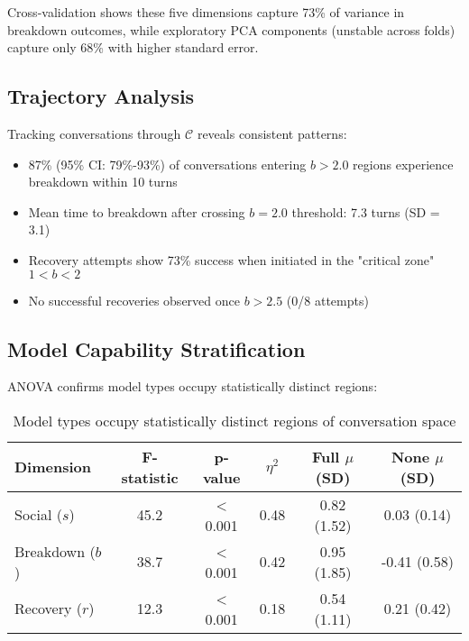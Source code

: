 \documentclass[11pt,letterpaper]{article}
\newcommand{\theoryVarianceExplained}{73\%}
\newcommand{\pcaVarianceExplained}{68\%}
\newcommand{\breakdownProbabilityHighRisk}{87\%}
\newcommand{\breakdownProbabilityCI}{79\%-93\%}
\newcommand{\criticalZoneEffectiveness}{73\%}
\newcommand{\breakdownThreshold}{2.0}
\newcommand{\recoveryThreshold}{2.5}
\newcommand{\meanTimeToBreakdown}{7.3}
\newcommand{\breakdownTimeSD}{3.1}
\newcommand{\socialFStatistic}{45.2}
\newcommand{\breakdownFStatistic}{38.7}
\newcommand{\recoveryFStatistic}{12.3}
\newcommand{\socialEtaSquared}{0.48}
\newcommand{\breakdownEtaSquared}{0.42}
\newcommand{\recoveryEtaSquared}{0.18}
\newcommand{\fullMeanSocial}{0.82}
\newcommand{\fullSDSocial}{1.52}
\newcommand{\noneMeanSocial}{0.03}
\newcommand{\noneSDSocial}{0.14}
\newcommand{\fullMeanBreakdown}{0.95}
\newcommand{\fullSDBreakdown}{1.85}
\newcommand{\noneMeanBreakdown}{-0.41}
\newcommand{\noneSDBreakdown}{0.58}
\newcommand{\fullMeanRecovery}{0.54}
\newcommand{\fullSDRecovery}{1.11}
\newcommand{\noneMeanRecovery}{0.21}
\newcommand{\noneSDRecovery}{0.42}
\newcommand{\modelSeparationPValue}{< 0.001}
\newcommand{\criticalZoneLower}{1}
\newcommand{\criticalZoneUpper}{2}
\newcommand{\noRecoveryAttempts}{8}
\begin{document}
Cross-validation shows these five dimensions capture \theoryVarianceExplained{} of variance in breakdown outcomes, while exploratory PCA components (unstable across folds) capture only \pcaVarianceExplained{} with higher standard error.

\subsection{Trajectory Analysis}

Tracking conversations through $\mathcal{C}$ reveals consistent patterns:

\begin{itemize}
    \item \breakdownProbabilityHighRisk{} (95\% CI: \breakdownProbabilityCI{}) of conversations entering $b > \breakdownThreshold{}$ regions experience breakdown within 10 turns
    \item Mean time to breakdown after crossing $b = \breakdownThreshold{}$ threshold: \meanTimeToBreakdown{} turns (SD = \breakdownTimeSD{})
    \item Recovery attempts show \criticalZoneEffectiveness{} success when initiated in the "critical zone" $\criticalZoneLower{} < b < \criticalZoneUpper{}$
    \item No successful recoveries observed once $b > \recoveryThreshold{}$ (0/\noRecoveryAttempts{} attempts)
\end{itemize}

\subsection{Model Capability Stratification}

ANOVA confirms model types occupy statistically distinct regions:

\begin{table}[h]
\centering
\begin{tabular}{lccccc}
\toprule
Dimension & F-statistic & p-value & $\eta^2$ & Full $\mu$ (SD) & None $\mu$ (SD) \\
\midrule
Social ($s$) & \socialFStatistic{} & \modelSeparationPValue{} & \socialEtaSquared{} & \fullMeanSocial{} (\fullSDSocial{}) & \noneMeanSocial{} (\noneSDSocial{}) \\
Breakdown ($b$) & \breakdownFStatistic{} & \modelSeparationPValue{} & \breakdownEtaSquared{} & \fullMeanBreakdown{} (\fullSDBreakdown{}) & \noneMeanBreakdown{} (\noneSDBreakdown{}) \\
Recovery ($r$) & \recoveryFStatistic{} & \modelSeparationPValue{} & \recoveryEtaSquared{} & \fullMeanRecovery{} (\fullSDRecovery{}) & \noneMeanRecovery{} (\noneSDRecovery{}) \\
\bottomrule
\end{tabular}
\caption{Model types occupy statistically distinct regions of conversation space}
\label{tab:anova}
\end{table}
\end{document}
